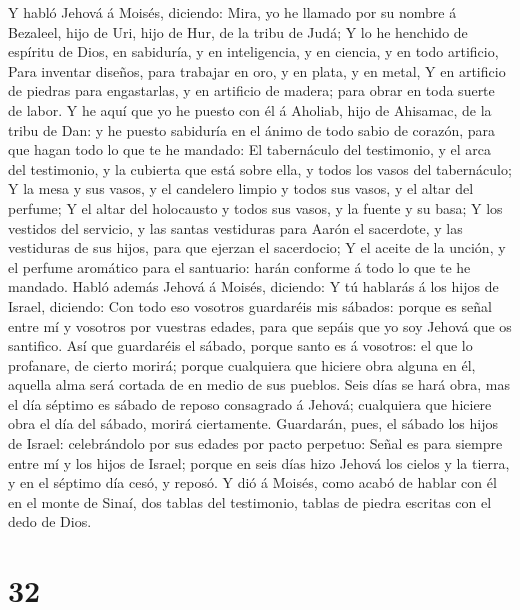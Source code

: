  Y habló Jehová á Moisés, diciendo:  Mira,
yo he llamado por su nombre á Bezaleel, hijo de Uri, hijo de Hur, de la
tribu de Judá;  Y lo he henchido de espíritu de Dios, en
sabiduría, y en inteligencia, y en ciencia, y en todo artificio,
 Para inventar diseños, para trabajar en oro, y en plata,
y en metal,  Y en artificio de piedras para engastarlas, y
en artificio de madera; para obrar en toda suerte de labor.
 Y he aquí que yo he puesto con él á Aholiab, hijo de
Ahisamac, de la tribu de Dan: y he puesto sabiduría en el ánimo de todo
sabio de corazón, para que hagan todo lo que te he mandado:
 El tabernáculo del testimonio, y el arca del testimonio,
y la cubierta que está sobre ella, y todos los vasos del tabernáculo;
 Y la mesa y sus vasos, y el candelero limpio y todos sus
vasos, y el altar del perfume;  Y el altar del holocausto
y todos sus vasos, y la fuente y su basa;  Y los vestidos
del servicio, y las santas vestiduras para Aarón el sacerdote, y las
vestiduras de sus hijos, para que ejerzan el sacerdocio; 
Y el aceite de la unción, y el perfume aromático para el santuario:
harán conforme á todo lo que te he mandado.  Habló además
Jehová á Moisés, diciendo:  Y tú hablarás á los hijos de
Israel, diciendo: Con todo eso vosotros guardaréis mis sábados: porque
es señal entre mí y vosotros por vuestras edades, para que sepáis que yo
soy Jehová que os santifico.  Así que guardaréis el
sábado, porque santo es á vosotros: el que lo profanare, de cierto
morirá; porque cualquiera que hiciere obra alguna en él, aquella alma
será cortada de en medio de sus pueblos.  Seis días se
hará obra, mas el día séptimo es sábado de reposo consagrado á Jehová;
cualquiera que hiciere obra el día del sábado, morirá ciertamente.
 Guardarán, pues, el sábado los hijos de Israel:
celebrándolo por sus edades por pacto perpetuo:  Señal es
para siempre entre mí y los hijos de Israel; porque en seis días hizo
Jehová los cielos y la tierra, y en el séptimo día cesó, y reposó.
 Y dió á Moisés, como acabó de hablar con él en el monte
de Sinaí, dos tablas del testimonio, tablas de piedra escritas con el
dedo de Dios.

\hypertarget{section-31}{%
\section{32}\label{section-31}}


